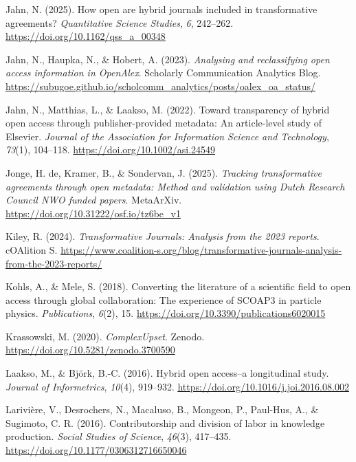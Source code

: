 \documentclass[a4paper,man,floatsintext,longtable,noextraspace,10pt]{apa6}
\newlength{\cslhangindent}
\newenvironment{CSLReferences}[2] %
{\begin{list}{}{%
  \setlength{\itemindent}{0pt}
  \setlength{\leftmargin}{0pt}
  \setlength{\parsep}{0pt}
  \ifodd #1
  \setlength{\leftmargin}{\cslhangindent}
  \setlength{\itemindent}{-1\cslhangindent}
  \fi
  \setlength{\itemsep}{#2\baselineskip}}}
{\end{list}}
\begin{document}
\begin{CSLReferences}{1}{0}
Jahn, N. (2025). How open are hybrid journals included in transformative
agreements? \emph{Quantitative Science Studies}, \emph{6}, 242--262.
\url{https://doi.org/10.1162/qss_a_00348}

Jahn, N., Haupka, N., \& Hobert, A. (2023). \emph{Analysing and
reclassifying open access information in OpenAlex}. {Scholarly
Communication Analytics Blog}.
\url{https://subugoe.github.io/scholcomm_analytics/posts/oalex_oa_status/}

Jahn, N., Matthias, L., \& Laakso, M. (2022). Toward transparency of
hybrid open access through publisher-provided metadata: An article-level
study of {Elsevier}. \emph{Journal of the Association for Information
Science and Technology}, \emph{73}(1), 104--118.
\url{https://doi.org/10.1002/asi.24549}

Jonge, H. de, Kramer, B., \& Sondervan, J. (2025). \emph{Tracking
transformative agreements through open metadata: Method and validation
using {Dutch Research Council NWO} funded papers}. MetaArXiv.
\url{https://doi.org/10.31222/osf.io/tz6be_v1}

Kiley, R. (2024). \emph{{Transformative Journals}: Analysis from the
2023 reports}. {cOAlition S}.
\url{https://www.coalition-s.org/blog/transformative-journals-analysis-from-the-2023-reports/}

Kohls, A., \& Mele, S. (2018). Converting the literature of a scientific
field to open access through global collaboration: The experience of
SCOAP3 in particle physics. \emph{Publications}, \emph{6}(2), 15.
\url{https://doi.org/10.3390/publications6020015}

Krassowski, M. (2020). \emph{ComplexUpset}. Zenodo.
\url{https://doi.org/10.5281/zenodo.3700590}

Laakso, M., \& Björk, B.-C. (2016). Hybrid open access--a longitudinal
study. \emph{Journal of Informetrics}, \emph{10}(4), 919--932.
\url{https://doi.org/10.1016/j.joi.2016.08.002}

Larivière, V., Desrochers, N., Macaluso, B., Mongeon, P., Paul-Hus, A.,
\& Sugimoto, C. R. (2016). Contributorship and division of labor in
knowledge production. \emph{Social Studies of Science}, \emph{46}(3),
417--435. \url{https://doi.org/10.1177/0306312716650046}


\end{CSLReferences}
\end{document}
